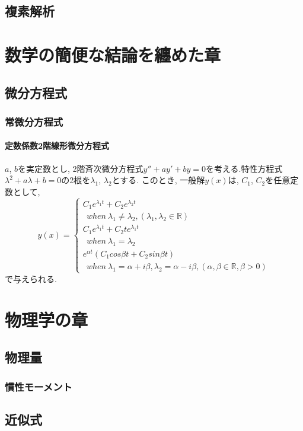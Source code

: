 \documentclass[]{jreport}
\begin{document}
\chapter{複素解析}

\part{数学の簡便な結論を纏めた章}
\chapter{微分方程式}
\section{常微分方程式}
\subsection{定数係数2階線形微分方程式}
$a$, $b$を実定数とし, 2階斉次微分方程式$y''+ay'+by=0$を考える.特性方程式$\lambda^2+a\lambda+b=0$の2根を$\lambda_{1}$, $\lambda_{2}$とする. このとき, 一般解$y(x)$は, $C_{1}$, $C_{2}$を任意定数として, \\
\begin{equation}
    y(x)= \left \{
        \begin{array}{l}
            C_{1}e^{\lambda_{1} t}+C_{2}e^{\lambda_{2} t}\\
            \ \ when \ \lambda_{1}\neq\lambda_{2}, (\lambda_{1}, \lambda_{2}\in\mathbb{R}) \\
            C_{1}e^{\lambda_{1} t}+C_{2}te^{\lambda_{1} t}\\
            \ \ when \ \lambda_{1}=\lambda_{2} \\
            e^{\alpha t}(C_{1}cos{\beta t}+C_{2}sin{\beta t}) \\
            \ \ when \ \lambda_{1}=\alpha+{i\beta}, \lambda_{2}=\alpha-{i\beta}, (\alpha, \beta\in\mathbb{R}, \beta>0)
        \end{array}
    \right.
\end{equation}
で与えられる.

\part{物理学の章}
\chapter{物理量}
\section{慣性モーメント}

\chapter{近似式}
\end{document}
